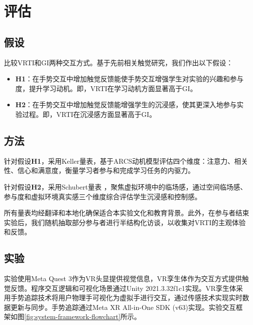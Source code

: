 \documentclass[runningheads]{llncs}
\begin{document}
\section{评估}
\subsection{假设}
比较VRTI和GI两种交互方式。基于先前相关触觉研究，我们作出以下假设：

\begin{itemize}[label=$\bullet$]
  \item {\textbf{H1}}：在手势交互中增加触觉反馈能使手势交互增强学生对实验的兴趣和参与度，提升学习动机。即，VRTI在学习动机方面显著高于GI。
  \item {\textbf{H2}}：在手势交互中增加触觉反馈能增强学生的沉浸感，使其更深入地参与实验过程。即，VRTI在沉浸感方面显著高于GI。
\end{itemize}

\subsection{方法}
针对假设\textbf{H1}，采用Keller量表\cite{keller1983motivational}，基于ARCS动机模型评估四个维度：注意力、相关性、信心和满意度，衡量学习者参与和完成学习任务的内驱力。


针对假设\textbf{H2}，采用Schubert量表 \cite{schubert2001experience}，聚焦虚拟环境中的临场感，通过空间临场感、参与度和虚拟环境真实感三个维度综合评估学生沉浸感和控制感。

所有量表均经翻译和本地化确保适合本实验文化和教育背景。此外，在参与者结束实验后，我们随机抽取部分参与者进行半结构化访谈，以收集对VRTI的主观体验和反馈。

\subsection{实验}
实验使用Meta Quest 3作为VR头显提供视觉信息，VR孪生体作为交互方式提供触觉反馈。程序交互逻辑和可视化场景通过Unity 2021.3.32f1c1实现。VR孪生体采用手势追踪技术将用户物理手可视化为虚拟手进行交互，通过传感技术实现实时数据更新与同步。手势追踪通过Meta XR All-in-One SDK (v63)实现。实验交互框架如图\ref{fig:system-framework-flowchart}所示。
\end{document}
